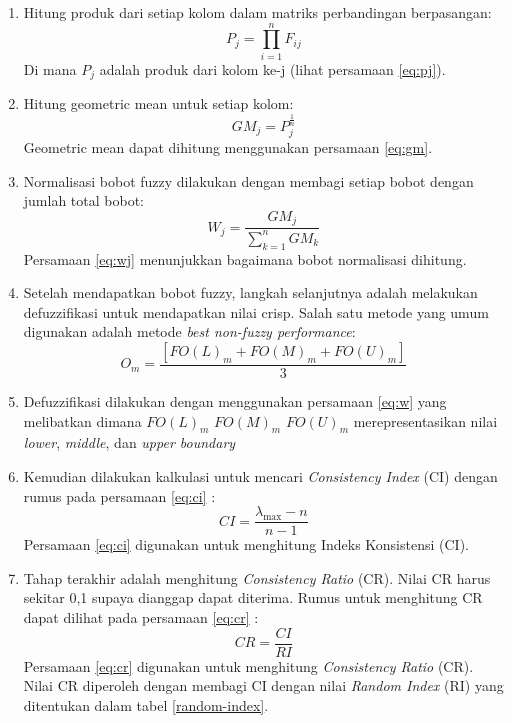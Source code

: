 \documentclass[journal,article,submit,pdftex,moreauthors]{Definitions/mdpi}
\begin{document}
\begin{enumerate}
    \item Hitung produk dari setiap kolom dalam matriks perbandingan berpasangan:
    \begin{equation}
        P_j = \prod_{i=1}^{n} F_{ij}
    \end{equation}
    \label{eq:pj}
    Di mana \( P_j \) adalah produk dari kolom ke-j (lihat persamaan \ref{eq:pj}).

    \item Hitung geometric mean untuk setiap kolom:
    \begin{equation}
        GM_j = P_j^{\frac{1}{n}}
    \end{equation}
    \label{eq:gm}
    Geometric mean dapat dihitung menggunakan persamaan \ref{eq:gm}.

    \item Normalisasi bobot fuzzy dilakukan dengan membagi setiap bobot dengan jumlah total bobot:
    \begin{equation}
        W_j = \frac{GM_j}{\sum_{k=1}^{n} GM_k}
    \end{equation}
    \label{eq:wj}
    Persamaan \ref{eq:wj} menunjukkan bagaimana bobot normalisasi dihitung.

    \item Setelah mendapatkan bobot fuzzy, langkah selanjutnya adalah melakukan defuzzifikasi untuk mendapatkan nilai crisp. Salah satu metode yang umum digunakan adalah metode \textit{best non-fuzzy performance}:
    \begin{equation}
        O_{m}=\frac{[FO(L)_{m}+FO(M)_{m}+FO(U)_{m}]}{3}
    \end{equation}
    \label{eq:w}
    \item 
    Defuzzifikasi dilakukan dengan menggunakan persamaan \ref{eq:w} yang melibatkan dimana  \( FO(L)_{m} \) \( FO(M)_{m} \) \( FO(U)_{m} \) merepresentasikan nilai \textit{lower}, \textit{middle}, dan \textit{upper boundary}

    \item Kemudian dilakukan kalkulasi untuk mencari \textit{Consistency Index} (CI) dengan rumus pada persamaan \ref{eq:ci} \cite{Singh2019}:
    \begin{equation}
        CI = \frac{\lambda_{\text{max}} - n}{n - 1}
    \end{equation}
    \label{eq:ci}
    Persamaan \ref{eq:ci} digunakan untuk menghitung Indeks Konsistensi (CI).

    \item Tahap terakhir adalah menghitung \textit{Consistency Ratio} (CR). Nilai CR harus sekitar 0,1 supaya dianggap dapat diterima. Rumus untuk menghitung CR dapat dilihat pada persamaan \ref{eq:cr} \cite{Singh2019}:
    \begin{equation}
        CR = \frac{CI}{RI}
    \end{equation}
    \label{eq:cr}
    Persamaan \ref{eq:cr} digunakan untuk menghitung \textit{Consistency Ratio} (CR). Nilai CR diperoleh dengan membagi CI dengan nilai \textit{Random Index} (RI) yang ditentukan dalam tabel \ref{random-index}.
\end{enumerate}
\end{document}
